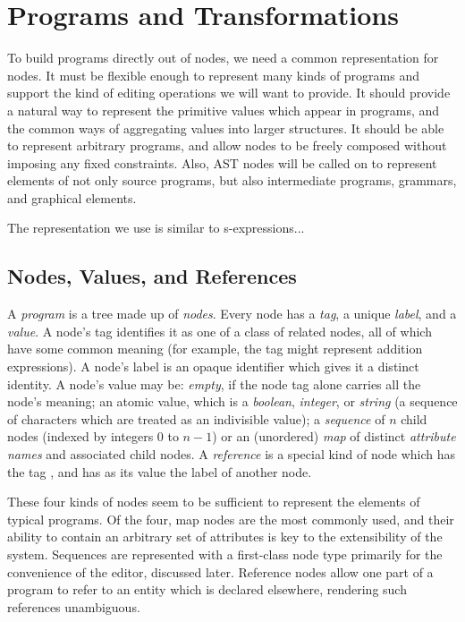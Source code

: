 \section{Programs and Transformations}
\label{ast}
To build programs directly out of nodes, we need a common representation for nodes. It must be flexible enough to represent many kinds of programs and support the kind of editing operations we will want to provide. It should provide a natural way to represent the primitive values which appear in programs, and the common ways of aggregating values into larger structures. It should be able to represent arbitrary programs, and allow nodes to be freely composed without imposing any fixed constraints. Also, AST nodes will be called on to represent elements of not only source programs, but also intermediate programs, grammars, and graphical elements.

The representation we use is similar to s-expressions... 

\subsection{Nodes, Values, and References}
A \emph{program} is a tree made up of \emph{nodes}. Every node has a \emph{tag}, a unique \emph{label}, and a \emph{value}. A node's tag identifies it as one of a class of related nodes, all of which have some common meaning (for example, the tag  might represent addition expressions). A node's label is an opaque identifier which gives it a distinct identity. A node's value may be: \emph{empty}, if the node tag alone carries all the node's meaning; an atomic value, which is a \emph{boolean}, \emph{integer}, or \emph{string} (a sequence of characters which are treated as an indivisible value); a \emph{sequence} of $n$ child nodes (indexed by integers $0$ to $n-1$) or an (unordered) \emph{map} of distinct \emph{attribute names} and associated child nodes. A \emph{reference} is a special kind of node which has the tag , and has as its value the label of another node.

These four kinds of nodes seem to be sufficient to represent the elements of typical programs. Of the four, map nodes are the most commonly used, and their ability to contain an arbitrary set of attributes is key to the extensibility of the system. Sequences are represented with a first-class node type primarily for the convenience of the editor, discussed later. Reference nodes allow one part of a program to refer to an entity which is declared elsewhere, rendering such references unambiguous.

